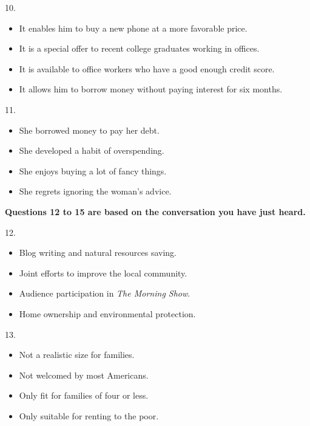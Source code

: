 \documentclass[UTF8,11pt]{ctexart}
\begin{document}
10.


\begin{itemize}[leftmargin=2em,itemsep=.2em,topsep=.4em]\item[A.] It enables him to buy a new phone at a more favorable price.
\item[B.] It is a special offer to recent college graduates working in offices.
\item[C.] It is available to office workers who have a good enough credit score.
\item[D.] It allows him to borrow money without paying interest for six months.
\end{itemize}

11.


\begin{itemize}[leftmargin=2em,itemsep=.2em,topsep=.4em]\item[A.] She borrowed money to pay her debt.
\item[B.] She developed a habit of overspending.
\item[C.] She enjoys buying a lot of fancy things.
\item[D.] She regrets ignoring the woman’s advice.
\end{itemize}

\textbf{Questions 12 to 15 are based on the conversation you have just heard.}


12.


\begin{itemize}[leftmargin=2em,itemsep=.2em,topsep=.4em]\item[A.] Blog writing and natural resources saving.
\item[B.] Joint efforts to improve the local community.
\item[C.] Audience participation in \textit{The Morning Show}.
\item[D.] Home ownership and environmental protection.
\end{itemize}

13.


\begin{itemize}[leftmargin=2em,itemsep=.2em,topsep=.4em]\item[A.] Not a realistic size for families.
\item[B.] Not welcomed by most Americans.
\item[C.] Only fit for families of four or less.
\item[D.] Only suitable for renting to the poor.
\end{itemize}
\end{document}
